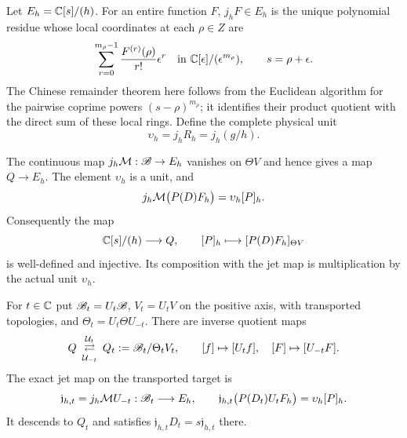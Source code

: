 \documentclass[11pt]{article}
\begin{document}
Let $E_h=\mathbb C[s]/(h)$. For an entire function $F$, $j_hF\in E_h$
is the unique polynomial residue whose local coordinates at each
$\rho\in Z$ are
\begin{equation}\label{hdt:eq:jets}
\sum_{r=0}^{m_\rho-1}\frac{F^{(r)}(\rho)}{r!}\epsilon^r
\quad\text{in }\mathbb C[\epsilon]/(\epsilon^{m_\rho}),\qquad s=\rho+\epsilon.
\end{equation}
The Chinese remainder theorem here follows from the Euclidean
algorithm for the pairwise coprime powers $(s-\rho)^{m_\rho}$;
it identifies their product quotient with the direct sum of these
local rings. Define the complete physical unit
\begin{equation}\label{hdt:eq:unit}
\upsilon_h=j_hR_h=j_h(g/h).
\end{equation}

\begin{hdttheorem}\label{hdt:thm:jets}
The continuous map $j_h\mathcal M:\mathscr B\to E_h$ vanishes on $\Theta V$
and hence gives a map $Q\to E_h$. The element $\upsilon_h$ is
a unit, and
\begin{equation}\label{hdt:eq:physical-jet}
j_h\mathcal M\bigl(P(D)F_h\bigr)=\upsilon_h[P]_h.
\end{equation}
Consequently the map
\begin{equation}\label{hdt:eq:physical-injection}
\mathbb C[s]/(h)\longrightarrow Q,\qquad
[P]_h\longmapsto[P(D)F_h]_{\Theta V}
\end{equation}
is well-defined and injective. Its composition with the jet map is
multiplication by the actual unit $\upsilon_h$.

For $t\in\mathbb C$ put $\mathscr B_t=U_t\mathscr B$, $V_t=U_tV$ on the positive
axis, with transported topologies, and
$\Theta_t=U_t\Theta U_{-t}$. There are inverse quotient maps
\begin{equation}\label{hdt:eq:quotient-transport}
Q\ \mathop{\rightleftarrows}^{\mathcal U_t}_{\mathcal U_{-t}}\
Q_t:=\mathscr B_t/\Theta_tV_t,
\qquad [f]\mapsto[U_tf],\quad[F]\mapsto[U_{-t}F].
\end{equation}
The exact jet map on the transported target is
\begin{equation}\label{hdt:eq:transported-jet}
\mathfrak j_{h,t}=j_h\mathcal M U_{-t}:\mathscr B_t\longrightarrow E_h,
\qquad
\mathfrak j_{h,t}\bigl(P(D_t)U_tF_h\bigr)
=\upsilon_h[P]_h.
\end{equation}
It descends to $Q_t$ and satisfies
$\mathfrak j_{h,t}D_t=s\mathfrak j_{h,t}$ there.
\end{hdttheorem}
\end{document}
